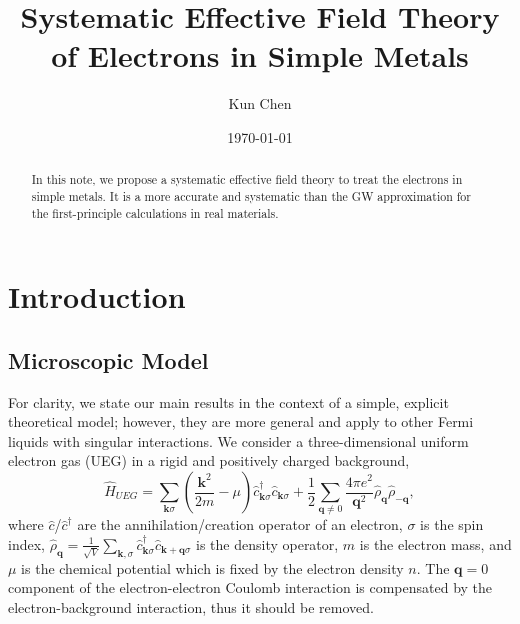 \documentclass[reprint,amsmath,amssymb,aps,prb]{revtex4-1}
\begin{document}
\newcommand{\red}[1]{\textcolor{red}{#1}}


\newcommand{\bk}{\mathbf{k}}
\newcommand{\bq}{\mathbf{q}}
\newcommand{\mL}{\mathcal{L}}
\newcommand{\bpsi}{\bar\psi}

\title{Systematic Effective Field Theory of Electrons in Simple Metals}
\author{Kun Chen}
\date{\today}

\begin{abstract}
    In this note, we propose a systematic effective field theory to treat the electrons in simple metals.
    It is a more accurate and systematic than the GW approximation for the first-principle calculations in real materials.
\end{abstract}

\maketitle

\tableofcontents
\section{Introduction}

\subsection{Microscopic Model}

For clarity, we state our main results in the context of a simple, explicit theoretical model; however, they are more general and apply to other Fermi liquids with singular interactions. We consider a three-dimensional uniform electron gas (UEG) in a rigid and positively charged background,
\begin{equation}
    \label{eq:jellium}
    \hat{H}_{\textit{UEG}} =\sum_{\mathbf{k} \sigma}\left(\frac{\mathbf{k}^{2}}{2m}-\mu\right) \hat{c}_{\mathbf{k} \sigma}^{\dagger} \hat{c}_{\mathbf{k} \sigma} +\frac{1}{2} \sum_{\bq \neq 0} \frac{4\pi e^2}{\bq^2}\hat{\rho}_{\bq}\hat{\rho}_{-\bq},
\end{equation}
where $\hat{c}$/$\hat{c}^\dagger$ are the annihilation/creation operator of an electron, $\sigma$ is the spin index, $\hat{\rho}_{\bq}=\frac{1}{\sqrt{V}}\sum_{\bk,\sigma} \hat{c}^\dag_{\bk \sigma} \hat{c}_{\bk+\bq \sigma}$ is the density operator, $m$ is the electron mass, and $\mu$ is the chemical potential which is fixed by the electron density $n$. The $\bq=0$ component of the electron-electron Coulomb interaction is compensated by the electron-background interaction, thus it should be removed.
\end{document}
